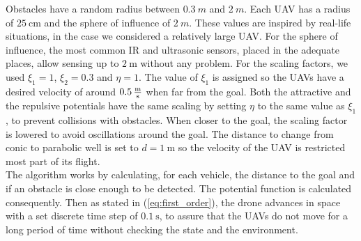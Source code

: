 \documentclass[journal]{IEEEtran}
\newcommand*{\subb}[1]{_{\mathrm{#1}}}
\begin{document}
	Obstacles have a random radius between $\SI{0.3}{m}$ and $\SI{2}{m}$. Each UAV has a radius of $\SI{25}{\centi\meter}$ and the sphere of influence of $\SI{2}{m}$. These values are inspired by real-life situations, in the case we considered a relatively large UAV. For the sphere of influence, the most common IR and ultrasonic sensors, placed in the adequate places, allow sensing up to $\SI{2}{\meter}$ without any problem. For the scaling factors, we used $\xi\subb{1} = 1$, $\xi\subb{2} = 0.3$ and $\eta = 1$. The value of $\xi\subb{1}$ is assigned so the UAVs have a desired velocity of around $\SI{0.5}{\frac{\meter}{\second}}$ when far from the goal. Both the attractive and the repulsive potentials have the same scaling by setting $\eta$ to the same value as $\xi\subb{1}$, to prevent collisions with obstacles. When closer to the goal, the scaling factor is lowered to avoid oscillations around the goal. The distance to change from conic to parabolic well is set to $d = \SI{1}{\meter}$ so the velocity of the UAV is restricted most part of its flight.\\
	
	The algorithm works by calculating, for each vehicle, the distance to the goal and if an obstacle is close enough to be detected. The potential function is calculated consequently. Then as stated in (\ref{eq:first_order}), the drone advances in space with a set discrete time step of $\SI{0.1}{\second}$, to assure that the UAVs do not move for a long period of time without checking the state and the environment.\\
\end{document}
